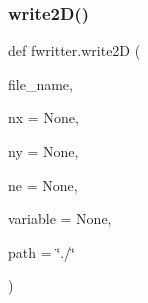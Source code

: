 \mbox{\label{namespacefwritter_af0d9ed19402ac07666b4a32c8e503b0f}} 
\subsubsection{\texorpdfstring{write2\+D()}{write2D()}}
{\footnotesize\ttfamily def fwritter.\+write2D (\begin{DoxyParamCaption}\item[{}]{file\+\_\+name,  }\item[{}]{nx = {\ttfamily None},  }\item[{}]{ny = {\ttfamily None},  }\item[{}]{ne = {\ttfamily None},  }\item[{}]{variable = {\ttfamily None},  }\item[{}]{path = {\ttfamily \char`\"{}./\char`\"{}} }\end{DoxyParamCaption})}

